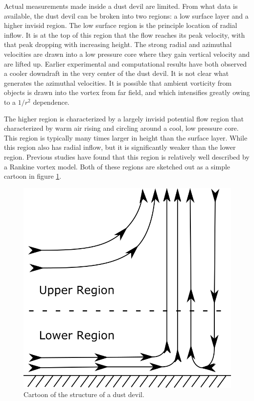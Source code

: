 Actual measurements made inside a dust devil are limited. From what data
is available, the dust devil can be broken into two regions: a low surface 
layer and a higher invisid region. The low surface region is the 
principle location of radial inflow. 
It is at the top of this region that the flow 
reaches its peak velocity, with that peak dropping with increasing height. 
The strong radial and azimuthal velocities are drawn into a low pressure core 
where they gain vertical velocity and are lifted up. Earlier experimental and 
computational results have both observed a cooler downdraft in the very center 
of the dust devil. It is not clear what generates the azimuthal velocities. It is 
possible that ambient vorticity from objects is drawn into the vortex from far 
field, and which intensifies greatly owing to a $1/r^2$ dependence.

The higher region is characterized by a largely invisid potential flow region 
that characterized by warm air rising and circling around a cool, 
low pressure core. This region is typically many times larger in height than the
surface layer. While this region also has radial inflow, but it is 
significantly weaker than the lower region. Previous studies have found that
this region is relatively well described by a Rankine vortex model\cite{}. 
Both of these regions are sketched out as a simple 
cartoon in figure \ref{fig:cartoon}. 

  \begin{figure}[!htb]
    \begin{center}
     \includegraphics[width = 12 cm]{figs/ground}
     \caption{Cartoon of the structure of a dust devil.}
     \label{fig:cartoon}
    \end{center}
  \end{figure}


